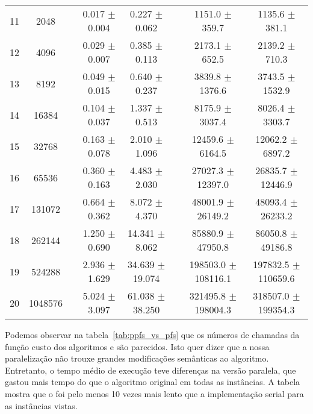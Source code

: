 \begin{table}
\begin{tabular}{cc c cc c cc}
11 &    2048 && 0.017 $\pm$ 0.004 & 0.227 $\pm$ 0.062 && 1151.0 $\pm$ 359.7 & 1135.6 $\pm$ 381.1 \\
12 &    4096 && 0.029 $\pm$ 0.007 & 0.385 $\pm$ 0.113 && 2173.1 $\pm$ 652.5 & 2139.2 $\pm$ 710.3 \\
13 &    8192 && 0.049 $\pm$ 0.015 & 0.640 $\pm$ 0.237 && 3839.8 $\pm$ 1376.6 & 3743.5 $\pm$ 1532.9 \\
14 &   16384 && 0.104 $\pm$ 0.037 & 1.337 $\pm$ 0.513 && 8175.9 $\pm$ 3037.4 & 8026.4 $\pm$ 3303.7 \\
15 &   32768 && 0.163 $\pm$ 0.078 & 2.010 $\pm$ 1.096 && 12459.6 $\pm$ 6164.5 & 12062.2 $\pm$ 6897.2 \\
16 &   65536 && 0.360 $\pm$ 0.163 & 4.483 $\pm$ 2.030 && 27027.3 $\pm$ 12397.0 & 26835.7 $\pm$ 12446.9 \\
17 &  131072 && 0.664 $\pm$ 0.362 & 8.072 $\pm$ 4.370 && 48001.9 $\pm$ 26149.2 & 48093.4 $\pm$ 26233.2 \\
18 &  262144 && 1.250 $\pm$ 0.690 & 14.341 $\pm$ 8.062 && 85880.9 $\pm$ 47950.8 & 86050.8 $\pm$ 49186.8 \\
19 &  524288 && 2.936 $\pm$ 1.629 & 34.639 $\pm$ 19.074 && 198503.0 $\pm$ 108116.1 & 197832.5 $\pm$ 110659.6 \\
20 & 1048576 && 5.024 $\pm$ 3.097 & 61.038 $\pm$ 38.250 && 321495.8 $\pm$ 198004.3 & 318507.0 $\pm$ 199354.3 \\
\bottomrule
\end{tabular}
\end{table}

Podemos observar na tabela~\ref{tab:ppfs_vs_pfs} que os números de 
chamadas da função custo dos algoritmos  e 
são parecidos. Isto quer dizer que a nossa paralelização não trouxe 
grandes modificações semânticas ao algoritmo. Entretanto, o tempo médio
de execução teve diferenças na versão paralela, que gastou mais tempo
do que o algoritmo original em todas as instâncias. A tabela mostra
que o  foi pelo menos 10 vezes mais lento que a 
implementação serial para as instâncias vistas.


